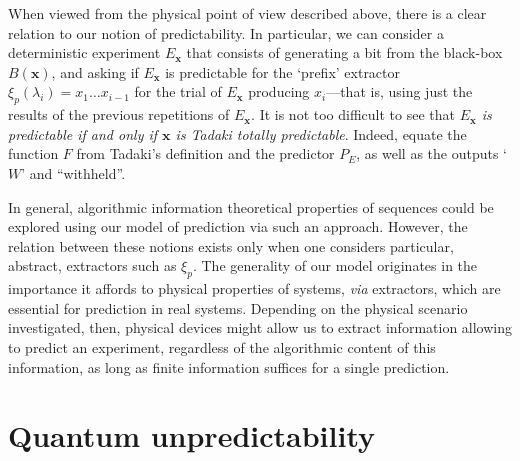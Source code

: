 \documentclass[%
 superscriptaddress,
 preprint,
 showpacs,
 showkeys,
 preprintnumbers,
 nofootinbib,
  amsmath,amssymb,
  aps,
 pra,
  longbibliography,
  floatfix,
 ]{revtex4-1}
\theoremstyle{definition}
\newcommand{\x}{\mathbf{x}}
\begin{document}
When viewed from the physical point of view described above, there is a clear relation to our notion of predictability.
In particular, we can consider a deterministic experiment $E_{\x}$ that consists of generating a bit from the black-box $B(\x)$, and asking if $E_{\x}$ is predictable for the `prefix' extractor $\xi_p(\lambda_{i})=x_1\dots x_{i-1}$ for the trial of $E_{\x}$ producing $x_{i}$---that is, using just the results of the previous repetitions of $E_{\x}$.
It is not too difficult to see that \emph{$E_{\x}$ is predictable if and only if $\x$ is Tadaki totally predictable}.
Indeed,  equate the function $F$ from Tadaki's definition and the predictor $P_E$, as well as the outputs `$W$' and ``withheld''.

In general, algorithmic information theoretical properties of sequences could be explored using our model of prediction via such an approach.
However, the relation between these notions exists only when one considers particular, abstract, extractors such as $\xi_p$.
The generality of our model originates in the importance it affords to physical properties of systems, \emph{via} extractors, which are essential for prediction in real systems.
Depending on the physical scenario investigated, then, physical devices might allow us to extract information allowing  to predict an experiment, regardless of the algorithmic content of this information, as long as finite information suffices for a single prediction.

\section{Quantum unpredictability}
\end{document}
